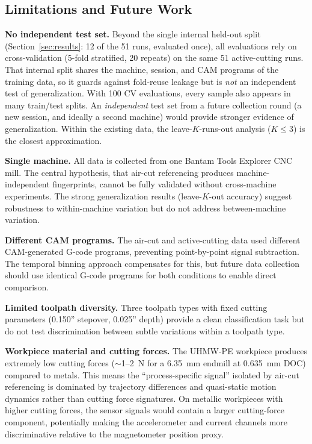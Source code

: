 \subsection{Limitations and Future Work}

\textbf{No independent test set.} Beyond the single internal held-out split (Section~\ref{sec:results}: 12 of the 51 runs, evaluated once), all evaluations rely on cross-validation (5-fold stratified, 20 repeats) on the same 51 active-cutting runs. That internal split shares the machine, session, and CAM programs of the training data, so it guards against fold-reuse leakage but is \emph{not} an independent test of generalization. With 100 CV evaluations, every sample also appears in many train/test splits. An \emph{independent} test set from a future collection round (a new session, and ideally a second machine) would provide stronger evidence of generalization. Within the existing data, the leave-$K$-runs-out analysis ($K \leq 3$) is the closest approximation.

\textbf{Single machine.} All data is collected from one Bantam Tools Explorer CNC mill. The central hypothesis, that air-cut referencing produces machine-independent fingerprints, cannot be fully validated without cross-machine experiments. The strong generalization results (leave-$K$-out accuracy) suggest robustness to within-machine variation but do not address between-machine variation.

\textbf{Different CAM programs.} The air-cut and active-cutting data used different CAM-generated G-code programs, preventing point-by-point signal subtraction. The temporal binning approach compensates for this, but future data collection should use identical G-code programs for both conditions to enable direct comparison.

\textbf{Limited toolpath diversity.} Three toolpath types with fixed cutting parameters (0.150'' stepover, 0.025'' depth) provide a clean classification task but do not test discrimination between subtle variations within a toolpath type.

\textbf{Workpiece material and cutting forces.} The UHMW-PE workpiece produces extremely low cutting forces ($\sim$1--2~N for a \SI{6.35}{\milli\meter} endmill at \SI{0.635}{\milli\meter} DOC) compared to metals. This means the ``process-specific signal'' isolated by air-cut referencing is dominated by trajectory differences and quasi-static motion dynamics rather than cutting force signatures. On metallic workpieces with higher cutting forces, the sensor signals would contain a larger cutting-force component, potentially making the accelerometer and current channels more discriminative relative to the magnetometer position proxy.

